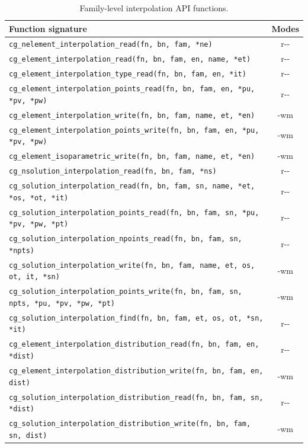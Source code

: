 \documentclass[11pt,letterpaper]{article}
\newif\ifvfourdraft
\newcommand{\vfour}[1]{\ifvfourdraft\textcolor{v4violet}{#1}\else#1\fi}
\begin{document}
\begin{table}[htbp]
\centering
\footnotesize
{}
\begin{tabular}{@{} l c @{}}
\toprule
\textbf{Function signature} & \textbf{Modes} \\
\midrule
\texttt{cg\_nelement\_interpolation\_read(fn, bn, fam, *ne)} & r{-}{-} \\
\texttt{cg\_element\_interpolation\_read(fn, bn, fam, en, name, *et)} & r{-}{-} \\
\texttt{cg\_element\_interpolation\_type\_read(fn, bn, fam, en, *it)} & r{-}{-} \\
\texttt{cg\_element\_interpolation\_points\_read(fn, bn, fam, en, *pu, *pv, *pw)} & r{-}{-} \\
\texttt{cg\_element\_interpolation\_write(fn, bn, fam, name, et, *en)} & {-}wm \\
\texttt{cg\_element\_interpolation\_points\_write(fn, bn, fam, en, *pu, *pv, *pw)} & {-}wm \\
\texttt{cg\_element\_isoparametric\_write(fn, bn, fam, name, et, *en)} & {-}wm \\
\addlinespace
\texttt{cg\_nsolution\_interpolation\_read(fn, bn, fam, *ns)} & r{-}{-} \\
\texttt{cg\_solution\_interpolation\_read(fn, bn, fam, sn, name, *et, *os, *ot, *it)} & r{-}{-} \\
\texttt{cg\_solution\_interpolation\_points\_read(fn, bn, fam, sn, *pu, *pv, *pw, *pt)} & r{-}{-} \\
\vfour{\texttt{cg\_solution\_interpolation\_npoints\_read(fn, bn, fam, sn, *npts)}} & \vfour{r{-}{-}} \\
\texttt{cg\_solution\_interpolation\_write(fn, bn, fam, name, et, os, ot, it, *sn)} & {-}wm \\
\texttt{cg\_solution\_interpolation\_points\_write(fn, bn, fam, sn, \vfour{npts,} *pu, *pv, *pw, *pt)} & {-}wm \\
\texttt{cg\_solution\_interpolation\_find(fn, bn, fam, et, os, ot, *sn, *it)} & r{-}{-} \\
\addlinespace
\texttt{cg\_element\_interpolation\_distribution\_read(fn, bn, fam, en, *dist)} & r{-}{-} \\
\texttt{cg\_element\_interpolation\_distribution\_write(fn, bn, fam, en, dist)} & {-}wm \\
\texttt{cg\_solution\_interpolation\_distribution\_read(fn, bn, fam, sn, *dist)} & r{-}{-} \\
\texttt{cg\_solution\_interpolation\_distribution\_write(fn, bn, fam, sn, dist)} & {-}wm \\
\bottomrule
\end{tabular}
\caption{Family-level interpolation API functions.}
\label{tab:family-api}
\end{table}
\end{document}
